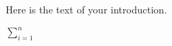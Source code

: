 \documentclass{article}
\begin{document}
Here is the text of your introduction.

  $
  \sum_{i=1}^{n}
  $
 
\end{document}
